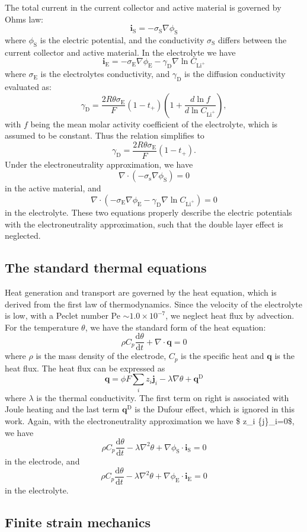 The total current in the current collector and active material is governed by Ohm\textquotesingle{}s law\+: \[ \boldsymbol{i}_\text{S}=-\sigma_\text{S} \nabla\phi_\text{S} \] where $\phi_\text{S}$ is the electric potential, and the conductivity $\sigma_\text{S}$ differs between the current collector and active material. In the electrolyte we have \[ \boldsymbol{i}_\text{E}=-\sigma_\text{E}\nabla\phi_\text{E}-\gamma_\text{D}\nabla\ln C_{\text{Li}^+} \] where $\sigma_\text{E}$ is the electrolyte\textquotesingle{}s conductivity, and $\gamma_\text{D}$ is the diffusion conductivity evaluated as\+: \[ \gamma_\text{D}=\frac{2R\theta \sigma_\text{E}}{F}\left(1-t_+\right)\left(1+\frac{d \ln f}{d\ln C_{\text{Li}^+}}\right), \] with $f$ being the mean molar activity coefficient of the electrolyte, which is assumed to be constant. Thus the relation simplifies to \[ \gamma_\text{D}=\frac{2 R\theta \sigma_\text{E}}{F}\left(1-t_+\right). \] Under the electroneutrality approximation, we have \[ \nabla\cdot (- \sigma_\text{s}\nabla\phi_\text{S})=0 \] in the active material, and \[ \nabla\cdot\left(-\sigma_\text{E}\nabla\phi_\text{E}-\gamma_\text{D}\nabla\ln C_{\text{Li}^+}\right)=0 \] in the electrolyte. These two equations properly describe the electric potentials with the electroneutrality approximation, such that the double layer effect is neglected.\hypertarget{battery_particle_section2}{}\subsection{The standard thermal equations}\label{battery_particle_section2}
Heat generation and transport are governed by the heat equation, which is derived from the first law of thermodynamics. Since the velocity of the electrolyte is low, with a Peclet number Pe $\sim 1.0\times 10^{-7}$, we neglect heat flux by advection. For the temperature $\theta$, we have the standard form of the heat equation\+: \[ \rho C_p\frac{\text{d}\theta}{\text{d}t}+\nabla \cdot\boldsymbol{q}=0 \] where $\rho$ is the mass density of the electrode, $C_p$ is the specific heat and $\boldsymbol{q}$ is the heat flux. The heat flux can be expressed as \[ \boldsymbol{q}=\phi F\sum_i z_i\boldsymbol{j}_i-\lambda\nabla\theta+\boldsymbol{q}^\text{D} \] where $\lambda$ is the thermal conductivity. The first term on right is associated with Joule heating and the last term $\boldsymbol{q}^\text{D}$ is the Dufour effect, which is ignored in this work. Again, with the electroneutrality approximation we have \$ z\+\_\+i \{j\}\+\_\+i=0\$, we have \[ \rho C_p\frac{\text{d}\theta}{\text{d}t}-\lambda \nabla^2\theta+\nabla\phi_\text{S}\cdot\boldsymbol{i}_\text{S}=0 \] in the electrode, and \[ \rho C_p\frac{\text{d}\theta}{\text{d}t}-\lambda \nabla^2\theta+\nabla\phi_\text{E}\cdot\boldsymbol{i}_\text{E}=0 \] in the electrolyte.\hypertarget{battery_particle_section3}{}\subsection{Finite strain mechanics}\label{battery_particle_section3}

